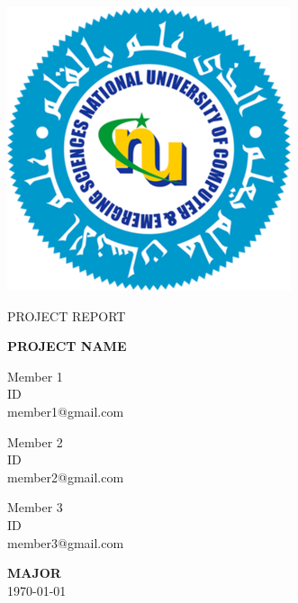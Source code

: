 \documentclass[a4paper, 12pt]{article}
\begin{document}
\begin{titlepage}

\begin{center}
   \includegraphics[scale=0.4]{Images/fast_nu.png} 
\end{center}
   
\thispagestyle{empty}

\center

\textsc{\large PROJECT REPORT}

\vspace{0.5in}

\noindent\makebox[\linewidth]{\rule{\linewidth}{1.2pt}}
\textsc{ \textbf{\large PROJECT NAME }}
\noindent\makebox[\linewidth]{\rule{\linewidth}{1.0pt}}

\vspace{0.5in}

\begin{minipage}{0.3\textwidth}
    \begin{flushleft}
        Member 1 \\
        ID \\
        member1@gmail.com
    \end{flushleft}
\end{minipage}
\begin{minipage}{0.3\textwidth}
    \begin{center}
        Member 2 \\
        ID \\
        member2@gmail.com
    \end{center}
\end{minipage}
\begin{minipage}{0.3\textwidth}
    \begin{flushright}
        Member 3 \\
        ID \\
        member3@gmail.com
    \end{flushright}
\end{minipage}

\vspace{2in}

\textbf{\large MAJOR} \\

\today

\end{titlepage}
\end{document}
